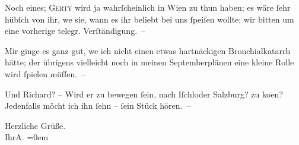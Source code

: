 \pstart
           {\pb}Noch eines; \textsc{Gerty} wird ja wahrſcheinlich in Wien zu thun
               haben; es wäre ſehr hübſch von ihr, we{\geminationn}{ }sie, wann es ihr beliebt bei uns ſpeiſen wollte;
               wir bitten um eine vorherige telegr. Verſtändigung. –\pend
           
\pstart
           Mir ginge es ganz gut, we{\geminationn} ich nicht einen etwas
               hartnäckigen Bronchialkatarrh hätte; der übrigens vielleicht noch in meinen
                  Septemberplänen eine kleine Rolle wird ſpielen müſſen. –\pend
           
\pstart
           {\pb}Und Richard? –
               Wird er zu bewegen ſein, nach Iſchl\introOben{}oder Salzburg?\introOben{} zu ko{\geminationm}en? Jedenfalls möcht ich ihn ſehn – ſein Stück hören. –\pend
           
\pstart
           Herzliche Grüße.{\\[\baselineskip]}Ihr\spacefill\mbox{A.}\pend
           \leftskip=0em{}\endnumbering{}  
      